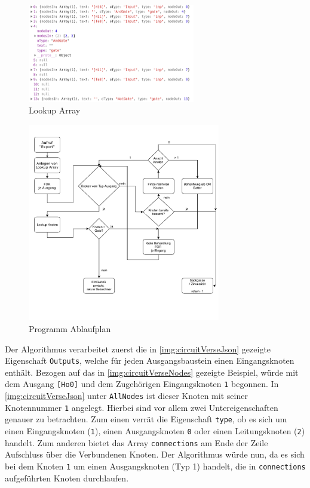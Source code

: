   \begin{figure}[H]
 	\begin{center}
 		\includegraphics[width=0.65\textwidth ,clip]{./images/circuitverseLookup.png}
 		\caption{Lookup Array}
 		\label{img:circuitVerseLookup}
 	\end{center} 
 \end{figure}	
 
 
   \begin{figure}[H]
 	\begin{center}
 		\includegraphics[width=0.75\textwidth ,clip]{./images/PAP7.pdf}
 		\caption{Programm Ablaufplan}
 		\label{img:circuitVersePAP}
 	\end{center} 
 \end{figure}
 
 
 Der Algorithmus verarbeitet zuerst die in \ref{img:circuitVerseJson} gezeigte Eigenschaft \texttt{Outputs}, welche für jeden Ausgangsbaustein einen Eingangsknoten enthält. Bezogen auf das in \ref{img:circuitVerseNodes} gezeigte Beispiel, würde mit dem Ausgang \texttt{[Ho0]} und dem Zugehörigen Eingangsknoten \texttt{1} begonnen. In \autoref{img:circuitVerseJson} unter \texttt{AllNodes} ist dieser Knoten mit seiner Knotennummer \texttt{1} angelegt. Hierbei sind vor allem zwei Untereigenschaften genauer zu betrachten. Zum einen verrät die Eigenschaft \texttt{type}, ob es sich um einen Eingangsknoten (\texttt{1}), einen Ausgangsknoten \texttt{0} oder einen Leitungsknoten (\texttt{2}) handelt. Zum anderen bietet das Array \texttt{connections} am Ende der Zeile Aufschluss über die Verbundenen Knoten. Der Algorithmus würde nun, da es sich bei dem Knoten \texttt{1} um einen Ausgangsknoten (Typ 1) handelt, die in \texttt{connections} aufgeführten Knoten durchlaufen. 
 
